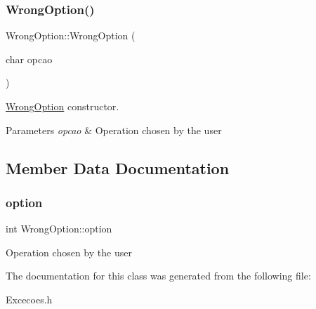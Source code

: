 \subsubsection{\texorpdfstring{Wrong\+Option()}{WrongOption()}}
{\footnotesize\ttfamily Wrong\+Option\+::\+Wrong\+Option (\begin{DoxyParamCaption}\item[{char}]{opcao }\end{DoxyParamCaption})\hspace{0.3cm}{\ttfamily [inline]}}



\hyperlink{class_wrong_option}{Wrong\+Option} constructor. 


\begin{DoxyParams}{Parameters}
{\em opcao} & Operation chosen by the user \\
\hline
\end{DoxyParams}


\subsection{Member Data Documentation}
\mbox{\label{class_wrong_option_a809170ee148dba4cf2638369d55b09a4}} 
\subsubsection{\texorpdfstring{option}{option}}
{\footnotesize\ttfamily int Wrong\+Option\+::option}

Operation chosen by the user 

The documentation for this class was generated from the following file\+:\begin{DoxyCompactItemize}
\item 
Excecoes.\+h\end{DoxyCompactItemize}

